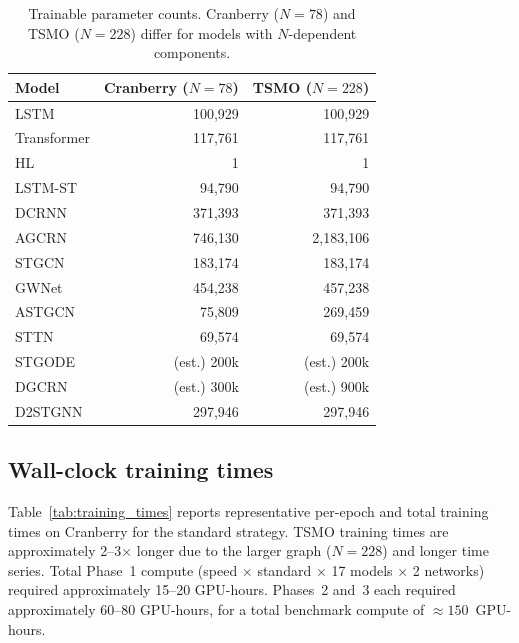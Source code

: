 \documentclass[a4paper]{cas-sc}
\begin{document}
\begin{table}[h]
\centering
\caption{Trainable parameter counts.
         Cranberry ($N{=}78$) and TSMO ($N{=}228$) differ for
         models with $N$-dependent components.}
\label{tab:params}
\small
\begin{tabular}{lrr}
\toprule
Model & Cranberry ($N{=}78$) & TSMO ($N{=}228$) \\
\midrule
LSTM           &    100,929 &    100,929 \\
Transformer    &    117,761 &    117,761 \\
HL             &          1 &          1 \\
LSTM-ST        &     94,790 &     94,790 \\
DCRNN          &    371,393 &    371,393 \\
AGCRN          &    746,130 &  2,183,106 \\
STGCN          &    183,174 &    183,174 \\
GWNet          &    454,238 &    457,238 \\
ASTGCN         &     75,809 &    269,459 \\
STTN           &     69,574 &     69,574 \\
STGODE         & (est.) 200k & (est.) 200k \\
DGCRN          &    (est.) 300k & (est.) 900k \\
D2STGNN        &    297,946 &    297,946 \\
\bottomrule
\end{tabular}
\end{table}

\subsection{Wall-clock training times}

Table~\ref{tab:training_times} reports representative per-epoch
and total training times on Cranberry for the standard strategy.
TSMO training times are approximately 2--3$\times$ longer due to
the larger graph ($N{=}228$) and longer time series.
Total Phase~1 compute (speed $\times$ standard $\times$ 17 models
$\times$ 2 networks) required approximately 15--20 GPU-hours.
Phases~2 and~3 each required approximately 60--80 GPU-hours,
for a total benchmark compute of $\approx 150$~GPU-hours.
\end{document}
